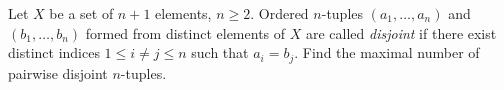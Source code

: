 Let $X$ be a set of $n + 1$ elements, $n\geq 2$. Ordered $n$-tuples $(a_1,\ldots,a_n)$ and $(b_1,\ldots,b_n)$ formed from distinct elements of $X$ are called\textit{ disjoint }if there exist distinct indices $1\leq i \neq j\leq n$ such that $a_i = b_j$. Find the maximal number of pairwise disjoint $n$-tuples.
